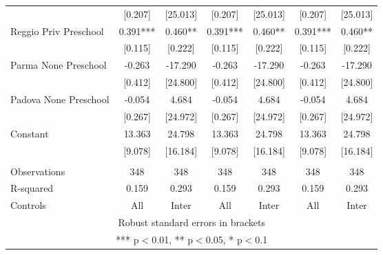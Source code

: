 \begin{tabular}{lcccccc}
 & [0.207] & [25.013] & [0.207] & [25.013] & [0.207] & [25.013] \\
Reggio Priv Preschool & 0.391*** & 0.460** & 0.391*** & 0.460** & 0.391*** & 0.460** \\
 & [0.115] & [0.222] & [0.115] & [0.222] & [0.115] & [0.222] \\
Parma None Preschool & -0.263 & -17.290 & -0.263 & -17.290 & -0.263 & -17.290 \\
 & [0.412] & [24.800] & [0.412] & [24.800] & [0.412] & [24.800] \\
Padova None Preschool & -0.054 & 4.684 & -0.054 & 4.684 & -0.054 & 4.684 \\
 & [0.267] & [24.972] & [0.267] & [24.972] & [0.267] & [24.972] \\
Constant & 13.363 & 24.798 & 13.363 & 24.798 & 13.363 & 24.798 \\
 & [9.078] & [16.184] & [9.078] & [16.184] & [9.078] & [16.184] \\
 &  &  &  &  &  &  \\
Observations & 348 & 348 & 348 & 348 & 348 & 348 \\
R-squared & 0.159 & 0.293 & 0.159 & 0.293 & 0.159 & 0.293 \\
 Controls & All & Inter & All & Inter & All & Inter \\ \hline
\multicolumn{7}{c}{ Robust standard errors in brackets} \\
\multicolumn{7}{c}{ *** p$<$0.01, ** p$<$0.05, * p$<$0.1} \\
\end{tabular}

